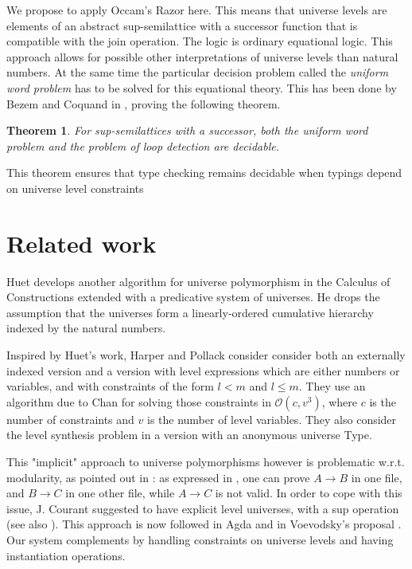 \documentclass[11pt,a4paper]{article}
\newtheorem{theorem}{Theorem}[section]
\theoremstyle{definition}
\def\Ordo{\mathcal{O}}
\begin{document}
We propose to apply Occam's Razor here. This means that universe levels
are elements of an abstract sup-semilattice with a successor function
that is compatible with the join operation. The logic is ordinary
equational logic.
This approach allows for possible other interpretations of universe levels
than natural numbers. At the same time the particular decision problem
called the \emph{uniform word problem} has to be solved for this equational theory.
This has been done by Bezem and Coquand in \cite{bezem-coquand:lattices},
proving the following theorem.

\begin{theorem}\label{thm:P-solvability}
For sup-semilattices with a successor, both the uniform word problem
and the problem of loop detection are decidable.
\end{theorem}
This theorem ensures that type checking remains decidable when
typings depend on universe level constraints


\section{Related work}

Huet \cite{Huet87} develops another algorithm for universe polymorphism
in the Calculus of Constructions extended with a predicative system of universes.
He drops the assumption that the universes form a linearly-ordered cumulative hierarchy indexed by the natural numbers.

Inspired by Huet's work, Harper and Pollack
\cite{HarperP91} consider consider both an externally indexed version and a version
with level expressions which are either numbers or variables, and with constraints of the form $l < m$ and $l \leq m$. They use an algorithm due to Chan
for solving those constraints in $\Ordo(c,v^3)$, where $c$ is the number of constraints and $v$ is the number of level variables. They also consider the level synthesis problem in a version with an anonymous universe Type.

This "implicit"
approach to universe polymorphisms however is problematic w.r.t. modularity, as pointed
out in \cite{Courant02}: as expressed in \cite{Simpson04},
one can prove $A\rightarrow B$ in one file, and $B\rightarrow C$ in one other file, while
$A\rightarrow C$ is not valid. In order to cope with this issue, J. Courant \cite{Courant02}
suggested to have explicit level universes, with a sup operation (see also \cite{herbelin05}).
This approach is now followed in Agda and in Voevodsky's proposal \cite{VV}. Our system complements
\cite{Courant02,VV} by handling constraints on universe levels and having instantiation operations.
\end{document}
